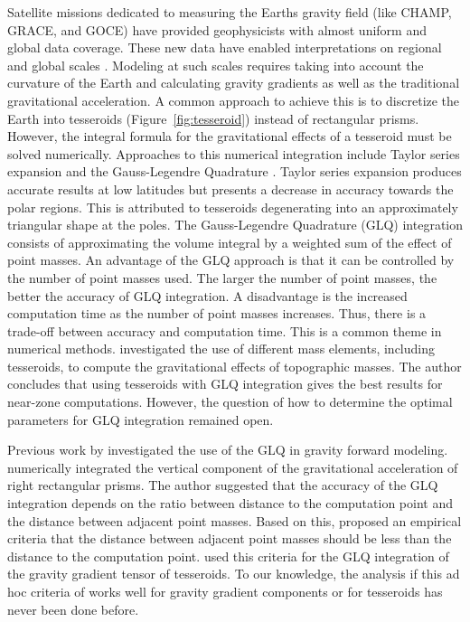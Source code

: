 \documentclass[paper,twocolumn,twoside]{geophysics}
\begin{document}
Satellite missions dedicated to measuring the Earths gravity field
(like CHAMP, GRACE, and GOCE)
have provided geophysicists with almost uniform and global data coverage.
These new data have enabled interpretations on regional and global scales
\citep[e.g.][]{Reguzzoni2013,Braitenberg2015}.
Modeling at such scales requires taking into account the curvature of the
Earth and calculating gravity gradients as well as the traditional
gravitational acceleration.
A common approach to achieve this is
to discretize the Earth into tesseroids (Figure~\ref{fig:tesseroid})
instead of rectangular prisms.
However, the integral formula for the gravitational effects of a tesseroid
must be solved numerically.
Approaches to this numerical integration include
Taylor series expansion \citep{Heck2007, Grombein2013}
and the Gauss-Legendre Quadrature \citep{Asgharzadeh2007}.
Taylor series expansion produces accurate results at low latitudes but
presents a decrease in accuracy towards the polar regions.
This is attributed to tesseroids degenerating into an approximately triangular
shape at the poles.
The Gauss-Legendre Quadrature (GLQ) integration consists of approximating
the volume integral by a weighted sum of the effect of point masses.
An advantage of the GLQ approach is that it can be
controlled by the number of point masses used.
The larger the number of point masses, the better the accuracy of GLQ
integration.
A disadvantage is the increased computation time as the number of
point masses increases.
Thus, there is a trade-off between accuracy and computation time.
This is a common theme in numerical methods.
\citet{Wild-Pfeiffer2008} investigated the use of different mass elements,
including tesseroids, to compute the gravitational effects of topographic
masses.
The author concludes that using tesseroids with GLQ integration gives the best
results for near-zone computations.
However, the question of how to determine the optimal parameters for GLQ
integration remained open.


Previous work by \citet{Ku1977} investigated the use of the GLQ in gravity forward modeling.
\citet{Ku1977} numerically integrated the vertical component of the
gravitational acceleration of right rectangular prisms.
The author suggested that the accuracy of the GLQ integration depends on
the ratio between distance to the computation point and the distance between
adjacent point masses.
Based on this, \citet{Ku1977} proposed an empirical criteria that the distance
between adjacent point masses should be less than the distance to the computation point.
\citet{Asgharzadeh2007} used  this criteria for the GLQ integration of
the gravity gradient tensor of tesseroids.
To our knowledge, the analysis if this ad hoc criteria of
\citet{Ku1977} works well for gravity gradient components or for tesseroids has never been done before.
\end{document}
